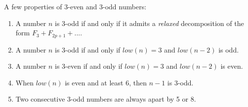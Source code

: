\documentclass[a4paper,11pt]{article}
\begin{document}
A few properties of 3-even and 3-odd numbers:
\begin{theorem}\label{threeevenodd}
\noindent
\begin{enumerate}
\item A number $n$ is 3-odd if and only if it admits
a \emph{relaxed} decomposition of the form $F_3 + F_{2p+1}+...$.
\item A number $n$ is 3-odd if and only if $low(n)=3$ and
$low(n-2)$ is odd.
\item A number $n$ is 3-even if and only if $low(n)=3$ and
$low(n-2)$ is even.
\item When $low(n)$ is even and at least 6, then $n-1$ is 3-odd.
\item Two consecutive 3-odd numbers are always apart by 5 or 8.
\end{enumerate}
\end{theorem}
\end{document}
